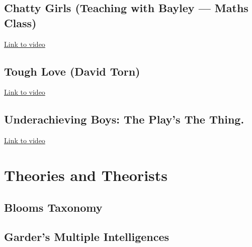 \documentclass[12pt]{report}
\begin{document}
\section{Chatty Girls (Teaching with Bayley --- Maths Class)}

\href{https://www.youtube.com/watch?v=Q3OxKAxpOdo}{Link to video}





\section{Tough Love (David Torn)}

\href{https://www.youtube.com/watch?v=ec0v4kzYkCY}{Link to video}






\section{Underachieving Boys: The Play's The Thing.}

\href{https://www.youtube.com/watch?v=9196qkVWaLw}{Link to video}













\chapter{Theories and Theorists}
\label{chap:theories}


\section{Blooms Taxonomy}
\label{sec:blooms_taxonomy}




\section{Garder's Multiple Intelligences}
\label{sec:gardner_theory}
\end{document}
